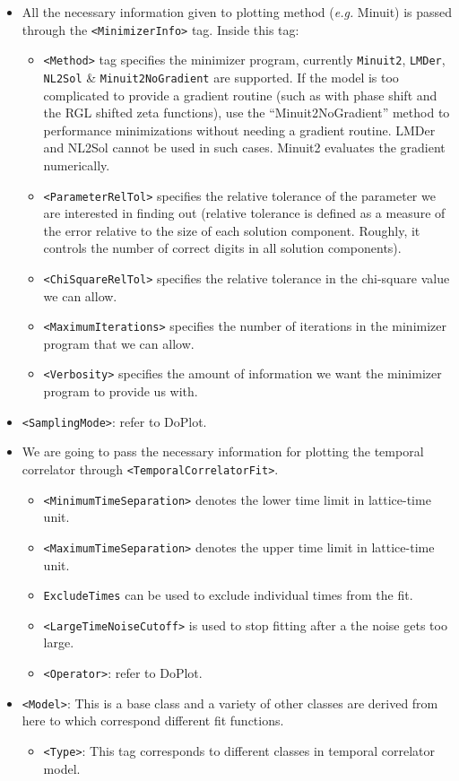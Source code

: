 \documentclass[12pt]{article}
\newcommand{\vb}{\texttt}
\begin{document}
\begin{itemize}
\item All the necessary information given to plotting method (\textit{e.g.} Minuit)
  is passed through the \vb{<MinimizerInfo>} tag. Inside this tag:
  \begin{itemize}
  \item \vb{<Method>} tag specifies the minimizer program, currently \vb{Minuit2},
    \vb{LMDer}, \vb{NL2Sol} \& \vb{Minuit2NoGradient} are supported. If the model is too complicated
    to provide a gradient routine (such as with phase shift and the RGL shifted
    zeta functions), use the ``Minuit2NoGradient'' method to performance minimizations
    without needing a gradient routine.  LMDer and NL2Sol cannot be used in such cases.
    Minuit2 evaluates the gradient numerically.
  \item \vb{<ParameterRelTol>} specifies the relative tolerance of the parameter we are interested
    in finding out (relative tolerance is defined as a measure of the error relative to the size
    of each solution component. Roughly, it controls the number of correct digits in all solution components).
  \item \vb{<ChiSquareRelTol>} specifies the relative tolerance in the chi-square value we can allow.
  \item \vb{<MaximumIterations>} specifies the number of iterations in the minimizer program that we can allow.
  \item \vb{<Verbosity>} specifies the amount of information we want the minimizer program to provide us with.
  \end{itemize}
\item \vb{<SamplingMode>}: refer to DoPlot.
\item We are going to pass the necessary information for plotting the temporal correlator
  through \vb{<TemporalCorrelatorFit>}.
  \begin{itemize}
  \item \vb{<MinimumTimeSeparation>} denotes  the lower time limit in lattice-time unit.
  \item \vb{<MaximumTimeSeparation>} denotes the upper time limit in lattice-time unit.
  \item \vb{ExcludeTimes} can be used to exclude individual times from the fit.
  \item \vb{<LargeTimeNoiseCutoff>} is used to stop fitting after a the noise gets too large.
  \item \vb{<Operator>}: refer to DoPlot.
  \end{itemize}
\item \vb{<Model>}: This is a base class and a variety of other classes are derived from here
  to which correspond different fit functions.
  \begin{itemize}
  \item \vb{<Type>}: This tag corresponds to different classes in temporal correlator model.
  \end{itemize}
\end{itemize}
\end{document}
